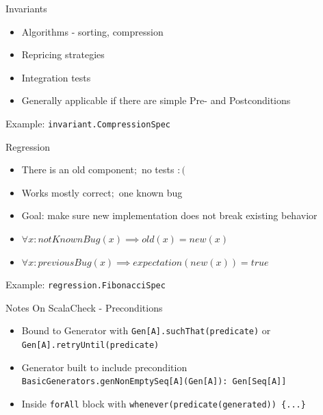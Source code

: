 \documentclass[xcolor=svgnames,handout]{beamer}
\begin{document}
    \begin{frame}
    {Invariants}
        \begin{itemize}
            \item Algorithms - sorting, compression
            \item Repricing strategies
            \item Integration tests
            \item Generally applicable if there are simple Pre- and Postconditions
        \end{itemize}

        Example: \texttt{invariant.CompressionSpec}

    \end{frame}


    \begin{frame}
    {Regression}
        \begin{itemize}
            \item There is an old component$;$ no tests $:($
            \item Works mostly correct$;$ one known bug
            \item Goal: make sure new implementation does not break existing behavior
            \item $\forall x: notKnownBug(x) \implies old(x) = new(x)$
            \item $\forall x: previousBug(x) \implies expectation(new(x)) = true $
        \end{itemize}

        Example: \texttt{regression.FibonacciSpec}

    \end{frame}

    \begin{frame}
    {Notes On ScalaCheck - Preconditions}

        \begin{itemize}
            \item Bound to Generator with \texttt{Gen[A].suchThat(predicate)} or \texttt{Gen[A].retryUntil(predicate)}
            \item Generator built to include precondition \texttt{BasicGenerators.genNonEmptySeq[A](Gen[A]): Gen[Seq[A]]}
            \item Inside \texttt{forAll} block with \texttt{whenever(predicate(generated)) \{...\}}
        \end{itemize}

    \end{frame}
\end{document}
